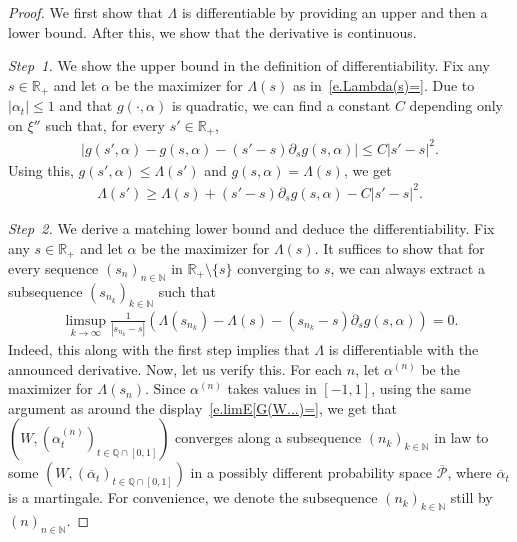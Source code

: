 \documentclass[11pt]{amsart}
\theoremstyle{remark}
\theoremstyle{definition}
\numberwithin{equation}{section}
\numberwithin{proposition}{section}
\numberwithin{figure}{section}
\numberwithin{table}{section}
\newcommand{\N}{\mathbb{N}}
\newcommand{\Q}{\mathbb{Q}}
\newcommand{\R}{\mathbb{R}}
\renewcommand{\leq}{\leqslant}
\renewcommand{\geq}{\geqslant}
\renewcommand{\bar}{\overline}
\newcommand{\Ll}{\left}
\newcommand{\Rr}{\right}
\newcommand{\1}{\mathbf{1}}
\newcommand{\msc}{\mathscr}
\newcommand{\pnp}{{(n)}}
\begin{document}
\begin{proof}
We first show that $\Lambda$ is differentiable by providing an upper and then a lower bound. After this, we show that the derivative is continuous.

\medskip
\noindent\textit{Step~1.}
We show the upper bound in the definition of differentiability. Fix any $s\in\R_+$ and let $\alpha$ be the maximizer for $\Lambda(s)$ as in~\eqref{e.Lambda(s)=}. Due to $|\alpha_t|\leq1$ and that $g(\cdot,\alpha)$ is quadratic, we can find a constant $C$ depending only on $\xi''$ such that, for every $s'\in\R_+$,
\begin{align*}
    \Ll|g(s',\alpha)-g(s,\alpha) - (s'-s)\partial_s g(s,\alpha)\Rr|\leq C|s'-s|^2.
\end{align*}
Using this, $g(s',\alpha)\leq \Lambda(s')$ and $g(s,\alpha)=\Lambda(s)$, we get
\begin{align*}
    \Lambda(s')\geq \Lambda(s) + (s'-s)\partial_s g(s,\alpha) - C|s'-s|^2.
\end{align*}

\medskip
\noindent\textit{Step~2.}
We derive a matching lower bound and deduce the differentiability. Fix any $s\in\R_+$ and let $\alpha$ be the maximizer for $\Lambda(s)$. It suffices to show that for every sequence $(s_n)_{n\in\N}$ in $\R_+\setminus\{s\}$ converging to $s$, we can always extract a subsequence $(s_{n_k})_{k\in\N}$ such that
\begin{align}\label{e.l.Lambda_diff_upper}
    \limsup_{k\to\infty}\frac{1}{\Ll|s_{n_k}-s\Rr|}\Ll(\Lambda(s_{n_k})-\Lambda(s) -(s_{n_k}-s)\partial_s g(s,\alpha)\Rr)=0.
\end{align}
Indeed, this along with the first step implies that $\Lambda$ is differentiable with the announced derivative. Now, let us verify this. For each $n$, let $\alpha^\pnp$ be the maximizer for $\Lambda(s_n)$. Since $\alpha^\pnp$ takes values in $[-1,1]$, using the same argument as around the display~\eqref{e.limE[G(W...)=}, we get that $(W,(\alpha^\pnp_t)_{t\in\Q\cap[0,1]})$ converges along a subsequence $(n_k)_{k\in\N}$ in law to some $(W,(\bar\alpha_t)_{t\in\Q\cap[0,1]})$ in a possibly different probability space $\bar{\msc P}$, where $\bar\alpha_t$ is a martingale. 
For convenience, we denote the subsequence $(n_k)_{k\in\N}$ still by $(n)_{n\in\N}$.


\end{proof}
\end{document}
